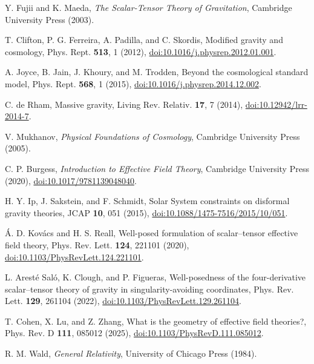 \documentclass{article}
\begin{document}
\begin{thebibliography}{99}
Y. Fujii and K. Maeda, \emph{The Scalar-Tensor Theory of Gravitation}, 
Cambridge University Press (2003).

T. Clifton, P. G. Ferreira, A. Padilla, and C. Skordis, Modified gravity and cosmology, 
Phys. Rept. \textbf{513}, 1 (2012),
\href{https://doi.org/10.1016/j.physrep.2012.01.001}{doi:10.1016/j.physrep.2012.01.001}.

A. Joyce, B. Jain, J. Khoury, and M. Trodden, Beyond the cosmological standard model, 
Phys. Rept. \textbf{568}, 1 (2015),
\href{https://doi.org/10.1016/j.physrep.2014.12.002}{doi:10.1016/j.physrep.2014.12.002}.

C. de Rham, Massive gravity, 
Living Rev. Relativ. \textbf{17}, 7 (2014),
\href{https://doi.org/10.12942/lrr-2014-7}{doi:10.12942/lrr-2014-7}.

V. Mukhanov, \emph{Physical Foundations of Cosmology}, 
Cambridge University Press (2005).

C. P. Burgess, \emph{Introduction to Effective Field Theory}, 
Cambridge University Press (2020),
\href{https://doi.org/10.1017/9781139048040}{doi:10.1017/9781139048040}.

H. Y. Ip, J. Sakstein, and F. Schmidt, Solar System constraints on disformal gravity theories, 
JCAP \textbf{10}, 051 (2015),
\href{https://doi.org/10.1088/1475-7516/2015/10/051}{doi:10.1088/1475-7516/2015/10/051}.

Á. D. Kovács and H. S. Reall, Well-posed formulation of scalar–tensor effective field theory, 
Phys. Rev. Lett. \textbf{124}, 221101 (2020),
\href{https://doi.org/10.1103/PhysRevLett.124.221101}{doi:10.1103/PhysRevLett.124.221101}.

L. Aresté Saló, K. Clough, and P. Figueras, Well-posedness of the four-derivative scalar–tensor theory of gravity in singularity-avoiding coordinates, 
Phys. Rev. Lett. \textbf{129}, 261104 (2022),
\href{https://doi.org/10.1103/PhysRevLett.129.261104}{doi:10.1103/PhysRevLett.129.261104}.

T. Cohen, X. Lu, and Z. Zhang, What is the geometry of effective field theories?, 
Phys. Rev. D \textbf{111}, 085012 (2025),
\href{https://doi.org/10.1103/PhysRevD.111.085012}{doi:10.1103/PhysRevD.111.085012}.

R. M. Wald, \emph{General Relativity}, 
University of Chicago Press (1984).


\end{thebibliography}
\end{document}
